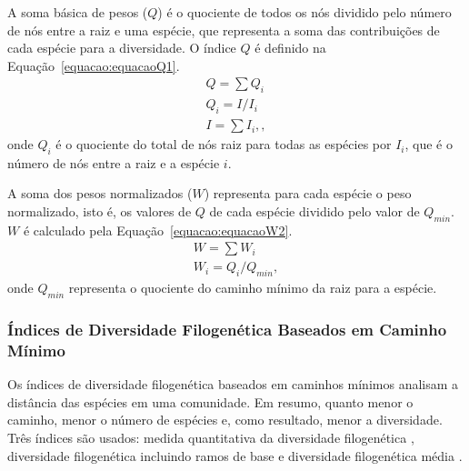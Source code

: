 A soma básica de pesos ($Q$) é o quociente de todos os nós dividido pelo número de nós entre a raiz e uma espécie, que representa a soma das contribuições de cada espécie para a diversidade. O índice $Q$ é definido na Equação~\ref{equacao:equacaoQ1}.
\begin{eqnarray}
\label{equacao:equacaoQ1}
Q = \sum Q_{i} \nonumber \\
Q_{i} = I/I_{i} \\
I = \sum I_{i}, \nonumber, 
\end{eqnarray}
onde $ Q_{i}$ é o quociente do total de nós raiz para todas as espécies por $ I_{i}$, que é o número de nós entre a raiz e a espécie $i$.

A soma dos pesos normalizados ($W$) representa para cada espécie o peso normalizado, isto é, os valores de $Q$ de cada espécie dividido pelo valor de $Q_{min}$. $W$ é calculado pela Equação~\ref{equacao:equacaoW2}.
\begin{eqnarray}
\label{equacao:equacaoW2}
W = \sum W_{i} \nonumber \\
W_{i} = Q_{i}/Q_{min},
\end{eqnarray}
onde $Q_{min}$ representa o quociente do caminho mínimo da raiz para a espécie.


\subsubsection{Índices de Diversidade Filogenética Baseados em Caminho Mínimo}
\label{sec:IndicesCM}

Os índices de diversidade filogenética baseados em caminhos mínimos analisam a distância das espécies em uma comunidade. Em resumo, quanto menor o caminho, menor o número de espécies e, como resultado, menor a diversidade. Três índices são usados: medida quantitativa da diversidade filogenética \cite{faith1992conservation}, diversidade filogenética incluindo ramos de base \cite{rodrigues2002maximising} e diversidade filogenética média \cite{rodrigues2002maximising}.


